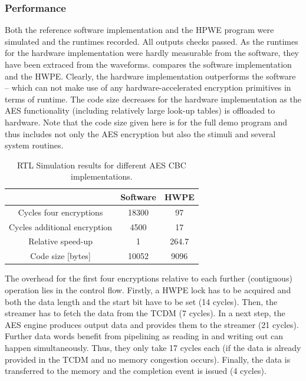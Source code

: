 \documentclass[a4paper, 12pt]{article}
\begin{document}
\subsubsection{Performance} \label{sec:improvements:results:performance}

Both the reference software implementation and the HPWE program were simulated and the runtimes recorded. All outputs checks passed. As the runtimes for the hardware implementation were hardly measurable from the software, they have been extraced from the waveforms.  compares the software implementation and the HWPE. Clearly, the hardware implementation outperforms the software -- which can not make use of any hardware-accelerated encryption primitives in terms of runtime. The code size decreases for the hardware implementation as the AES functionality (including relatively large look-up tables) is offloaded to hardware. Note that the code size given here is for the full demo program and thus includes not only the AES encryption but also the stimuli and several system routines.

\begin{table}[h]
    \centering
    \begin{tabular}{c|c c}
        \toprule
        & Software & HWPE \\
        \midrule
		Cycles four encryptions & 18300 & 97 \\
		Cycles additional encryption & 4500 & 17 \\
		Relative speed-up & 1  & 264.7 \\
		Code size [bytes] & 10052 & 9096 \\
        \bottomrule
    \end{tabular}
	\caption{RTL Simulation results for different AES CBC implementations.}
	\label{tab:results}
\end{table}

The overhead for the first four encryptions relative to each further (contiguous) operation lies in the control flow. Firstly, a HWPE lock has to be acquired and both the data length and the start bit have to be set (14 cycles). Then, the streamer has to fetch the data from the TCDM (7 cycles). In a next step, the AES engine produces output data and provides them to the streamer (21 cycles). Further data words benefit from pipelining as reading in and writing out can happen simultaneously. Thus, they only take 17 cycles each (if the data is already provided in the TCDM and no memory congestion occurs). Finally, the data is transferred to the memory and the completion event is issued (4 cycles). 
\end{document}
